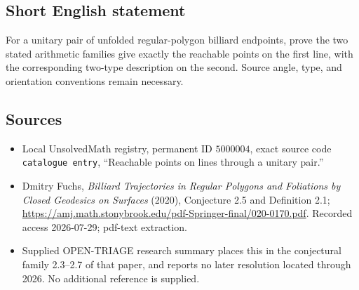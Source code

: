 \documentclass[11pt]{article}
\begin{document}
\subsection{Short English statement}
For a unitary pair of unfolded regular-polygon billiard endpoints, prove the two stated arithmetic families give exactly the reachable points on the first line, with the corresponding two-type description on the second. Source angle, type, and orientation conventions remain necessary.
\subsection{Sources}
\begin{itemize}
\item Local UnsolvedMath registry, permanent ID \(5000004\), exact source code \texttt{catalogue entry}, ``Reachable points on lines through a unitary pair.''
\item Dmitry Fuchs, \emph{Billiard Trajectories in Regular Polygons and Foliations by Closed Geodesics on Surfaces} (2020), Conjecture 2.5 and Definition 2.1; \url{https://amj.math.stonybrook.edu/pdf-Springer-final/020-0170.pdf}. Recorded access 2026-07-29; pdf-text extraction.
\item Supplied OPEN-TRIAGE research summary places this in the conjectural family 2.3--2.7 of that paper, and reports no later resolution located through 2026. No additional reference is supplied.
\end{itemize}
\end{document}
